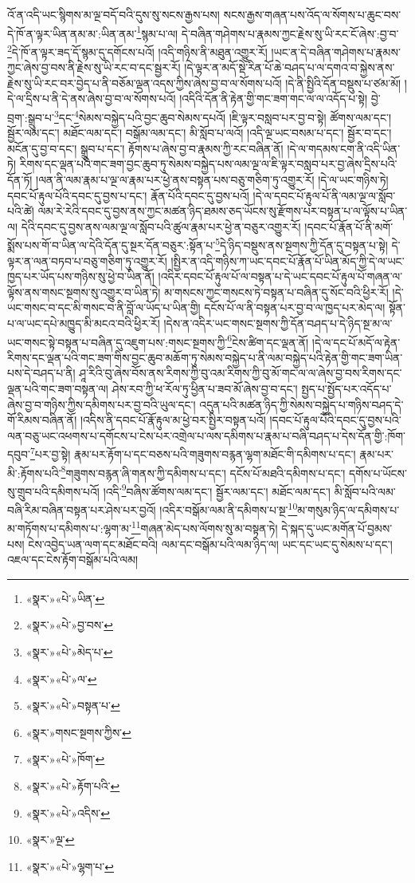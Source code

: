 འོ་ན་འདི་ཡང་སྙིགས་མ་ལྔ་བདོ་བའི་དུས་སུ་སངས་རྒྱས་པས། སངས་རྒྱས་གཞན་པས་འོད་ལ་སོགས་པ་ཆུང་བས་དེ་ཁོ་ན་ལྟར་ཡིན་ནམ་མ་:ཡིན་ནམ་\footnote{«སྣར་»«པེ་»ཡིན་}སྙམ་པ་ལ། དེ་བཞིན་གཤེགས་པ་རྣམས་ཀྱང་རྗེས་སུ་ཡི་རང་ངོ་ཞེས་:བྱ་བ་\footnote{«སྣར་»«པེ་»བྱ་བས་}དེ་ཁོ་ན་ལྟར་ཟད་དོ་སྙམ་དུ་དགོངས་པའོ། །འདི་གཉིས་ནི་མཐུན་འགྱུར་རོ། །ཡང་ན་དེ་བཞིན་གཤེགས་པ་རྣམས་ཀྱང་ཞེས་བྱ་བས་ནི་རྗེས་སུ་ཡི་རང་བ་དང་སྦྱར་རོ། །དེ་ལྟར་ན་མདོ་སྡེ་རིན་པོ་ཆེ་བཤད་པ་ལ་དགའ་བ་སྐྱེས་ནས་རྗེས་སུ་ཡི་རང་བར་བྱེད་པ་ནི་བཅོམ་ལྡན་འདས་ཀྱིས་ཞེས་བྱ་བ་ལ་སོགས་པའོ། །དེ་ནི་སྤྱིའི་དོན་བསྡུས་པ་ཙམ་མོ། །དེ་ལ་དྲིས་པ་ནི་དེ་ནས་ཞེས་བྱ་བ་ལ་སོགས་པའོ། །འདིའི་དོན་ནི་རྟེན་གྱི་གང་ཟག་གང་ལ་ལ་འདོད་པ་སྟེ། བྱེ་བྲག་:སྒྲུབ་པ་\footnote{«སྣར་»«པེ་»མེད་པ་}དང་\footnote{«སྣར་»«པེ་»ལ་}སེམས་བསྐྱེད་པའི་བྱང་ཆུབ་སེམས་དཔའོ། །ཇི་ལྟར་བསླབ་པར་བྱ་བ་སྟེ། ཚོགས་ལམ་དང་། སྦྱོར་ལམ་དང་། མཐོང་ལམ་དང་། བསྒོམ་ལམ་དང་། མི་སློབ་པ་ལའོ། །འདི་ལྔ་ཡང་བསམ་པ་དང་། སྦྱོར་བ་དང་། མངོན་དུ་བྱ་བ་དང་། སྒྲུབ་པ་དང་། རྟོགས་པ་ཞེས་བྱ་བ་རྣམས་ཀྱི་རང་བཞིན་ནོ། །དེ་ལ་གདམས་ངག་ནི་འདི་ཡིན་ཏེ། རིགས་དང་ལྡན་པའི་གང་ཟག་བྱང་ཆུབ་ཏུ་སེམས་བསྐྱེད་པས་ལམ་ལྔ་ལ་ཇི་ལྟར་བསླབ་པར་བྱ་ཞེས་དྲིས་པའི་དོན་ཏོ། །ལན་ནི་ལམ་རྣམ་པ་ལྔ་ལ་རྣམ་པར་ཕྱེ་ནས་བསྟན་པས་བཅུ་གཅིག་ཏུ་འགྱུར་རོ། །དེ་ལ་ཡང་གཉིས་ཏེ། དབང་པོ་རྟུལ་པོའི་དབང་དུ་བྱས་པ་དང་། རྣོན་པོའི་དབང་དུ་བྱས་པའོ། །དེ་ལ་དབང་པོ་རྟུལ་པོ་ནི་ལམ་ལྔ་ལ་སློབ་པའི་ཚེ། ལམ་རེ་རེའི་དབང་དུ་བྱས་ནས་ཀྱང་མཚན་ཉིད་ཐམས་ཅད་ཡོངས་སུ་རྫོགས་པར་བསྟན་པ་ལ་ལྟོས་པ་ཡིན་ལ། དེའི་དབང་དུ་བྱས་ནས་ལམ་ལྔ་ལ་སློབ་པའི་ཚུལ་རྣམ་པར་ཕྱེ་ན་བཅུར་འགྱུར་རོ། །དབང་པོ་རྣོན་པོ་ནི་མགོ་སྨོས་པས་གོ་བ་ཡིན་ལ་དེའི་དོན་དུ་སྔར་དོན་བཅུར་:སྟོན་པ་\footnote{«སྣར་»«པེ་»བསྟན་པ་}དེ་ཉིད་བསྡུས་ནས་སྔགས་ཀྱི་དོན་དུ་བསྟན་པ་སྟེ། དེ་ལྟར་ན་ལན་བཏབ་པ་བཅུ་གཅིག་ཏུ་འགྱུར་རོ། །སྤྱིར་ན་འདི་གཉིས་ཀ་ཡང་དབང་པོ་རྣོན་པོ་ཡིན་མོད་ཀྱི་དེ་ལ་ཡང་ཁྱད་པར་ཡོད་པས་གཉིས་སུ་ཕྱེ་བ་ཡིན་ནོ། །འདིར་དབང་པོ་རྟུལ་པོ་ལ་བསྟན་པ་དེ་ཡང་དབང་པོ་རྟུལ་པོ་གཞན་ལ་ལྟོས་ནས་གསང་སྔགས་སུ་འགྱུར་བ་ཡིན་ཏེ། མ་གསངས་ཀྱང་གསངས་ཏེ་བསྟན་པ་བཞིན་དུ་སོང་བའི་ཕྱིར་རོ། །དེ་ཡང་གསང་བ་དང་མི་གསང་བ་ནི་བློ་ལ་ཡོད་པ་ཡིན་གྱི། དངོས་པོ་ལ་ནི་བསྟན་པར་བྱ་བ་ལ་ཁྱད་པར་མེད་ལ། སྟོན་པ་ལ་ཡང་དཔེ་མཁྱུད་མི་མངའ་བའི་ཕྱིར་རོ། །དེས་ན་འདིར་ཡང་གསང་སྔགས་ཀྱི་དོན་བཤད་པ་དེ་ཉིད་སྔ་མ་ལ་ཡང་གསང་སྟེ་བསྟན་པ་བཞིན་དུ་འཇུག་པས་:གསང་སྔགས་ཀྱི་\footnote{«སྣར་»གསང་སྔགས་ཀྱིས་}ངེས་ཚིག་དང་ལྡན་ནོ། །དེ་ལ་དང་པོ་མདོ་ལ་རྟེན་རིགས་དང་ལྡན་པའི་གང་ཟག་གིས་བྱང་ཆུབ་མཆོག་ཏུ་སེམས་བསྐྱེད་པ་ནི་ལམ་བསྐྱེད་པའི་རྟེན་གྱི་གང་ཟག་ཡིན་པས་དེ་བཤད་པ་ནི། ཤཱ་རིའི་བུ་ཞེས་བོས་ནས་རིགས་ཀྱི་བུ་འམ་རིགས་ཀྱི་བུ་མོ་གང་ལ་ལ་ཞེས་བྱ་བས་རིགས་དང་ལྡན་པའི་གང་ཟག་བསྟན་ལ། ཤེས་རབ་ཀྱི་ཕ་རོལ་ཏུ་ཕྱིན་པ་ཟབ་མོ་ཞེས་བྱ་བ་དང་། སྤྱད་པ་སྤྱོད་པར་འདོད་པ་ཞེས་བྱ་བ་གཉིས་ཀྱིས་དམིགས་པར་བྱ་བའི་ཡུལ་དང་། འདུན་པའི་མཚན་ཉིད་ཀྱི་སེམས་བསྐྱེད་པ་གཉིས་བཤད་དེ་གོ་རིམས་བཞིན་ནོ། །འདིས་ནི་དབང་པོ་རྣོ་རྟུལ་མ་ཕྱེ་བར་སྤྱིར་བསྟན་པའོ། །དབང་པོ་རྟུལ་པོའི་དབང་དུ་བྱས་པའི་ལན་བཅུ་ཡང་འཕགས་པ་དགོངས་པ་ངེས་པར་འགྲེལ་པ་ལས་དམིགས་པ་རྣམ་པ་བཞི་བཤད་པ་དེས་དོན་གྱི་:ཁོག་དབུབ་\footnote{«སྣར་»«པེ་»ཁོག་}པར་བྱ་སྟེ། རྣམ་པར་རྟོག་པ་དང་བཅས་པའི་གཟུགས་བརྙན་ལྷག་མཐོང་གི་དམིགས་པ་དང་། རྣམ་པར་མི་:རྟོགས་པའི་\footnote{«སྣར་»«པེ་»རྟོག་པའི་}གཟུགས་བརྙན་ཞི་གནས་ཀྱི་དམིགས་པ་དང་། དངོས་པོ་མཐའི་དམིགས་པ་དང་། དགོས་པ་ཡོངས་སུ་གྲུབ་པའི་དམིགས་པའོ། །འདི་\footnote{«སྣར་»«པེ་»འདིས་}བཞིས་ཚོགས་ལམ་དང་། སྦྱོར་ལམ་དང་། མཐོང་ལམ་དང་། མི་སློབ་པའི་ལམ་བཞི་རིམ་བཞིན་བསྟན་པར་ཤེས་པར་བྱའོ། །འདིར་བསྒོམ་ལམ་ནི་དམིགས་པ་སྔ་\footnote{«སྣར་»ལྔ་}མ་གསུམ་ཉིད་ལ་དམིགས་པ་མ་གཏོགས་པ་དམིགས་པ་:ལྷག་མ་\footnote{«སྣར་»«པེ་»ལྷག་པ་}གཞན་མེད་པས་ལོགས་སུ་མ་བསྟན་ཏེ། དེ་སྐད་དུ་ཡང་མགོན་པོ་བྱམས་པས། ངེས་འབྱེད་ཡན་ལག་དང་མཐོང་བའི། ལམ་དང་བསྒོམ་པའི་ལམ་ཉིད་ལ། ཡང་དང་ཡང་དུ་སེམས་པ་དང་། འཇལ་དང་ངེས་རྟོག་བསྒོམ་པའི་ལམ། 